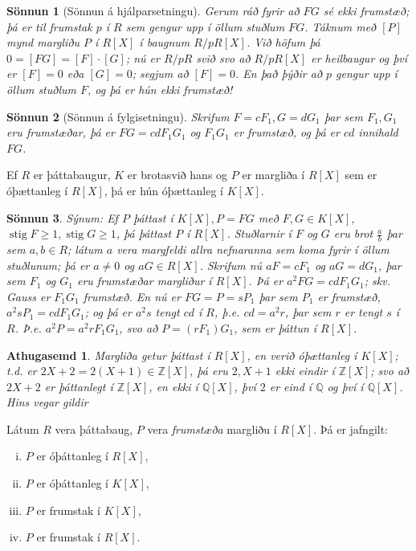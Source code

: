\documentclass[a4paper,icelandic,11pt]{book}
\theoremstyle{plain}
\newtheorem*{ath}{Athugasemd}
\newtheorem*{sonnun}{Sönnun}
\newcommand{\Z}{\mathbb{Z}}
\newcommand{\Q}{\mathbb{Q}}
\DeclareMathOperator{\stig}{stig} %
\begin{document}
\begin{sonnun}
  [Sönnun á hjálparsetningu]
  Gerum ráð fyrir að $FG$ sé ekki frumstæð; þá er til frumstak $p$ í $R$ sem
  gengur upp í öllum stuðlum $FG$. Táknum með $[P]$ mynd margliðu $P$ í $R[X]$ í
  baugnum $R/pR[X]$.  Við höfum þá $0 = [FG] = [F]\cdot[G]$; nú er $R/pR$ svið
  svo að $R/pR[X]$ er heilbaugur og því er $[F]=0$ eða $[G]=0$; segjum að
  $[F]=0$. En það þýðir að $p$ gengur upp í öllum stuðlum $F$, og þá er hún ekki
  frumstæð!
\end{sonnun}
\begin{sonnun}
  [Sönnun á fylgisetningu]
  Skrifum $F=cF_1,G=dG_1$ þar sem $F_1,G_1$ eru frumstæðar, þá er $FG=cdF_1G_1$
  og $F_1G_1$ er frumstæð, og þá er $cd$ innihald $FG$.
\end{sonnun}
\begin{hjalparsetn}
  Ef $R$ er þáttabaugur, $K$ er brotasvið hans og $P$ er margliða í $R[X]$ sem
  er óþættanleg í $R[X]$, þá er hún óþættanleg í $K[X]$.
\end{hjalparsetn}
\begin{sonnun}
  Sýnum: Ef $P$ þáttast í $K[X], P=FG$ með $F,G\in K[X]$, $\stig F\geq 1,\stig
  G\geq 1$, þá þáttast $P$ í $R[X]$. Stuðlarnir í $F$ og $G$ eru brot $\frac ab$
  þar sem $a,b\in R$; látum $a$ vera margfeldi allra nefnaranna sem koma fyrir í
  öllum stuðlunum; þá er $a\neq 0$ og $aG\in R[X]$. Skrifum nú $aF = cF_1$ og
  $aG=dG_1$, þar sem $F_1$ og $G_1$ eru frumstæðar margliður í $R[X]$. Þá er
  $a^2 FG = cd F_1 G_1$; skv. Gauss er $F_1 G_1$ frumstæð. En nú er $FG = P =
  sP_1$ þar sem $P_1$ er frumstæð, $a^2sP_1 = cd F_1 G_1$; og þá er $a^2s$ tengt
  $cd$ í $R$, þ.e. $cd = a^2 r$, þar sem $r$ er tengt $s$ í $R$. Þ.e. $a^2 P =
  a^2 r F_1 G_1$, svo að $P = (rF_1)G_1$, sem er þáttun í $R[X]$. 
\end{sonnun}
\begin{ath}
  Margliða getur þáttast í $R[X]$, en verið óþættanleg í $K[X]$; t.d. er $2X+2 =
  2(X+1)\in\Z[X]$, þá eru $2,X+1$ ekki eindir í $\Z[X]$; svo að $2X+2$ er
  þáttanlegt í $\Z[X]$, en ekki í $\Q[X]$, því $2$ er eind í $\Q$ og því í
  $\Q[X]$. Hins vegar gildir
\end{ath}
\begin{setn}
  Látum $R$ vera þáttabaug, $P$ vera \emph{frumstæða} margliðu í $R[X]$. Þá er jafngilt:
  \begin{enumerate}[(i)]
  \item $P$ er óþáttanleg í $R[X]$,
  \item $P$ er óþáttanleg í $K[X]$,
  \item $P$ er frumstak í $K[X]$,
  \item $P$ er frumstak í $R[X]$.
  \end{enumerate}
\end{setn}
\end{document}
